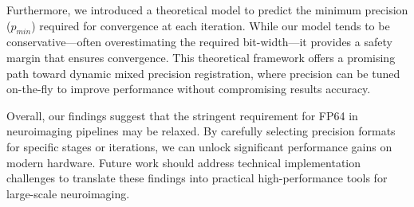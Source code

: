 \documentclass[journal,twoside,web]{ieeecolor}
\begin{document}
Furthermore, we introduced a theoretical model to predict the minimum precision ($p_{min}$) required for convergence at each iteration. While our model tends to be conservative---often overestimating the required bit-width---it provides a safety margin that ensures convergence. This theoretical framework offers a promising path toward dynamic mixed precision registration, where precision can be tuned on-the-fly to improve performance without compromising results accuracy.

Overall, our findings suggest that the stringent requirement for FP64 in neuroimaging pipelines may be relaxed. By carefully selecting precision formats for specific stages or iterations, we can unlock significant performance gains on modern hardware. Future work should address technical implementation challenges to translate these findings into practical high-performance tools for large-scale neuroimaging.



\end{document}
